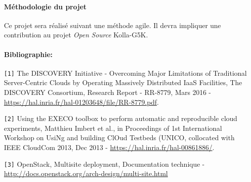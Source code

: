 \documentclass[a4paper,11pt]{article}
\begin{document}
\begin{note}
\paragraph*{Méthodologie du projet\\}
Ce projet sera réalisé suivant une méthode agile. Il devra impliquer une
contribution au projet \emph{Open Source} Kolla-G5K.


\paragraph*{Bibliographie:\\}
%
\texttt{[1]} The DISCOVERY Initiative - Overcoming Major Limitations of Traditional Server-Centric Clouds by Operating Massively Distributed IaaS Facilities,  The DISCOVERY Consortium, Research Report - RR-8779, Mars 2016 - \url{https://hal.inria.fr/hal-01203648/file/RR-8779.pdf}.

\texttt{[2]} Using the EXECO toolbox to perform automatic and reproducible cloud experiments, Matthieu Imbert et al., in Proceedings of 1st International Workshop on UsiNg and building ClOud Testbeds (UNICO, collocated with IEEE CloudCom 2013, Dec 2013 - \url{https://hal.inria.fr/hal-00861886/}.

\texttt{[3]} OpenStack, Multisite deployment, Documentation technique - \url{http://docs.openstack.org/arch-design/multi-site.html}
\end{note}
\end{document}
